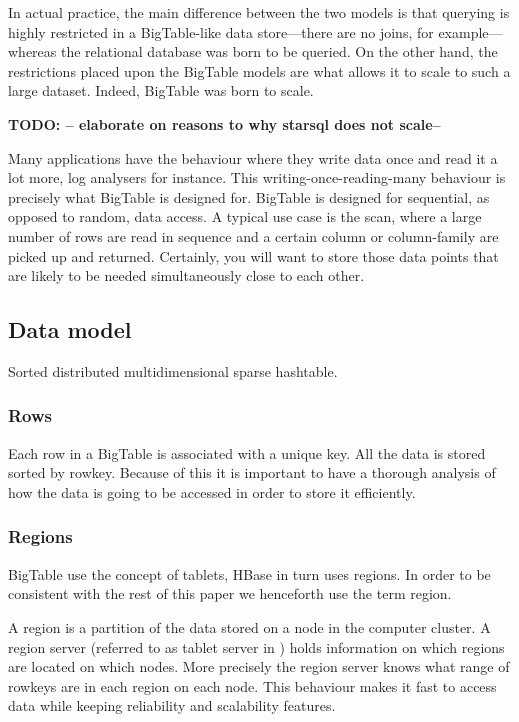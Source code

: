 \documentclass[a4paper,10pt]{book}
\begin{document}
In actual practice, the main difference between the two models is that
querying is highly restricted in a BigTable-like data store---there are no
joins, for example---whereas the relational database was born to be queried.
On the other hand, the restrictions placed upon the BigTable models are
what allows it to scale to such a large dataset. Indeed, BigTable was born
to scale.

\textbf{TODO: -- elaborate on reasons to why starsql does not scale--}

Many applications have the behaviour where they write data once and read it
a lot more, log analysers for instance. This writing-once-reading-many
behaviour is precisely what BigTable is designed for. BigTable is designed
for sequential, as opposed to random, data access. A typical use case is
the scan, where a large number of rows are read in sequence and a certain
column or column-family are picked up and returned. Certainly, you will
want to store those data points that are likely to be needed simultaneously
close to each other. \cite{bigtable}


\subsection{Data model}

Sorted distributed multidimensional sparse hashtable.


\subsubsection{Rows}

Each row in a BigTable is associated with a unique key. All the data is
stored sorted by rowkey. Because of this it is important to have a thorough
analysis of how the data is going to be accessed in order to store it
efficiently.



\subsubsection{Regions}

BigTable use the concept of tablets, HBase in turn uses regions. In order
to be consistent with the rest of this paper we henceforth use the term
region.

A region is a partition of the data stored on a node in the computer
cluster. A region server (referred to as tablet server in \cite{bigtable})
holds information on which regions are located on which nodes. More
precisely the region server knows what range of rowkeys are in each region
on each node. This behaviour makes it fast to access data while keeping
reliability and scalability features.
\end{document}
